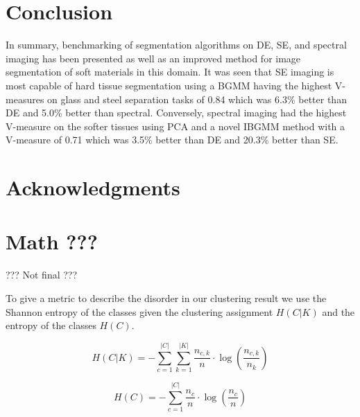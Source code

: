 \documentclass[a4paper,11pt]{article}
\begin{document}
\section{Conclusion}

In summary, benchmarking of segmentation algorithms on DE, SE, and spectral imaging has been presented as well as an improved method for image segmentation of soft materials in this domain. It was seen that SE imaging is most capable of hard tissue segmentation using a BGMM having the highest V-measures on glass and steel separation tasks of 0.84 which was 6.3\% better than DE and 5.0\% better than spectral. Conversely, spectral imaging had the highest V-measure on the softer tissues using PCA and a novel IBGMM method with a V-measure of 0.71 which was 3.5\% better than DE and 20.3\% better than SE.


\section*{Acknowledgments}

\appendix{}
\section{Math ???}

??? Not final ???

To give a metric to describe the disorder in our clustering result we use the Shannon entropy of the classes given the clustering assignment $H(C|K)$ and the entropy of the classes  $H(C)$.

\begin{equation}
H(C|K) = - \sum_{c=1}^{|C|} \sum_{k=1}^{|K|} \frac{n_{c,k}}{n}
\cdot \log\left(\frac{n_{c,k}}{n_k}\right)
\end{equation}

\begin{equation}
H(C) = - \sum_{c=1}^{|C|} \frac{n_c}{n} \cdot \log\left(\frac{n_c}{n}\right)
\end{equation}
\end{document}
